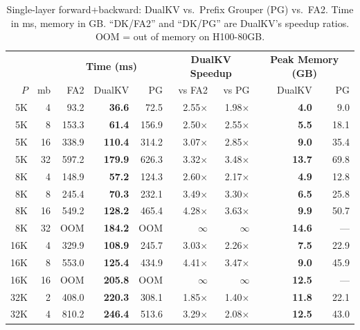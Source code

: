 \documentclass{article}
\begin{document}
\begin{table}[ht]
\centering
\small
\caption{Single-layer forward+backward: DualKV vs.\ Prefix Grouper (PG) vs.\ FA2. Time in ms, memory in GB. ``DK/FA2'' and ``DK/PG'' are DualKV's speedup ratios. OOM = out of memory on H100-80GB.}
\label{tab:prefix-grouper-comparison}
\setlength{\tabcolsep}{3.5pt}
\begin{tabular}{@{}rr|rrr|rr|rr@{}}
\toprule
& & \multicolumn{3}{c|}{\textbf{Time (ms)}} & \multicolumn{2}{c|}{\textbf{DualKV Speedup}} & \multicolumn{2}{c}{\textbf{Peak Memory (GB)}} \\
$P$ & mb & FA2 & DualKV & PG & vs FA2 & vs PG & DualKV & PG \\
\midrule
5K   & 4  & 93.2   & \textbf{36.6}  & 72.5   & 2.55$\times$ & 1.98$\times$ & \textbf{4.0}  & 9.0 \\
5K   & 8  & 153.3  & \textbf{61.4}  & 156.9  & 2.50$\times$ & 2.55$\times$ & \textbf{5.5}  & 18.1 \\
5K   & 16 & 338.9  & \textbf{110.4} & 314.2  & 3.07$\times$ & 2.85$\times$ & \textbf{9.0}  & 35.4 \\
5K   & 32 & 597.2  & \textbf{179.9} & 626.3  & 3.32$\times$ & 3.48$\times$ & \textbf{13.7} & 69.8 \\
\midrule
8K   & 4  & 148.9  & \textbf{57.2}  & 124.3  & 2.60$\times$ & 2.17$\times$ & \textbf{4.9}  & 12.8 \\
8K   & 8  & 245.4  & \textbf{70.3}  & 232.1  & 3.49$\times$ & 3.30$\times$ & \textbf{6.5}  & 25.8 \\
8K   & 16 & 549.2  & \textbf{128.2} & 465.4  & 4.28$\times$ & 3.63$\times$ & \textbf{9.9}  & 50.7 \\
8K   & 32 & \multicolumn{1}{c}{OOM} & \textbf{184.2} & \multicolumn{1}{c|}{OOM} & $\infty$ & $\infty$ & \textbf{14.6} & --- \\
\midrule
16K  & 4  & 329.9  & \textbf{108.9} & 245.7  & 3.03$\times$ & 2.26$\times$ & \textbf{7.5}  & 22.9 \\
16K  & 8  & 553.0  & \textbf{125.4} & 434.9  & 4.41$\times$ & 3.47$\times$ & \textbf{9.0}  & 45.9 \\
16K  & 16 & \multicolumn{1}{c}{OOM} & \textbf{205.8} & \multicolumn{1}{c|}{OOM} & $\infty$ & $\infty$ & \textbf{12.5} & --- \\
\midrule
32K  & 2  & 408.0  & \textbf{220.3} & 308.1  & 1.85$\times$ & 1.40$\times$ & \textbf{11.8} & 22.1 \\
32K  & 4  & 810.2  & \textbf{246.4} & 513.6  & 3.29$\times$ & 2.08$\times$ & \textbf{12.5} & 43.0 \\

\end{tabular}
\end{table}
\end{document}
